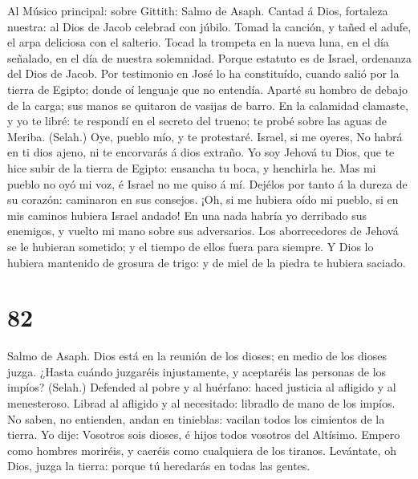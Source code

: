  Al Músico principal: sobre Gittith: Salmo de Asaph.
Cantad á Dios, fortaleza nuestra: al Dios de Jacob celebrad con júbilo.
 Tomad la canción, y tañed el adufe, el arpa deliciosa con
el salterio.  Tocad la trompeta en la nueva luna, en el
día señalado, en el día de nuestra solemnidad.  Porque
estatuto es de Israel, ordenanza del Dios de Jacob.  Por
testimonio en José lo ha constituído, cuando salió por la tierra de
Egipto; donde oí lenguaje que no entendía.  Aparté su
hombro de debajo de la carga; sus manos se quitaron de vasijas de barro.
 En la calamidad clamaste, y yo te libré: te respondí en
el secreto del trueno; te probé sobre las aguas de Meriba. (Selah.)
 Oye, pueblo mío, y te protestaré. Israel, si me oyeres,
 No habrá en ti dios ajeno, ni te encorvarás á dios
extraño.  Yo soy Jehová tu Dios, que te hice subir de la
tierra de Egipto: ensancha tu boca, y henchirla he.  Mas
mi pueblo no oyó mi voz, é Israel no me quiso á mí. 
Dejélos por tanto á la dureza de su corazón: caminaron en sus consejos.
 ¡Oh, si me hubiera oído mi pueblo, si en mis caminos
hubiera Israel andado!  En una nada habría yo derribado
sus enemigos, y vuelto mi mano sobre sus adversarios. 
Los aborrecedores de Jehová se le hubieran sometido; y el tiempo de
ellos fuera para siempre.  Y Dios lo hubiera mantenido de
grosura de trigo: y de miel de la piedra te hubiera saciado.

\hypertarget{section-81}{%
\section{82}\label{section-81}}

 Salmo de Asaph. Dios está en la reunión de los dioses; en
medio de los dioses juzga.  ¿Hasta cuándo juzgaréis
injustamente, y aceptaréis las personas de los impíos? (Selah.)
 Defended al pobre y al huérfano: haced justicia al
afligido y al menesteroso.  Librad al afligido y al
necesitado: libradlo de mano de los impíos.  No saben, no
entienden, andan en tinieblas: vacilan todos los cimientos de la tierra.
 Yo dije: Vosotros sois dioses, é hijos todos vosotros del
Altísimo.  Empero como hombres moriréis, y caeréis como
cualquiera de los tiranos.  Levántate, oh Dios, juzga la
tierra: porque tú heredarás en todas las gentes.

